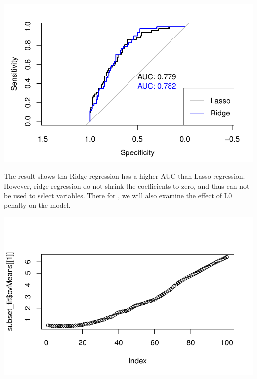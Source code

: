 \documentclass[
  letterpaper,
  DIV=11,
  numbers=noendperiod]{scrartcl}
\newenvironment{Shaded}{\begin{snugshade}}{\end{snugshade}}
\newcommand{\AttributeTok}[1]{\textcolor[rgb]{0.40,0.45,0.13}{#1}}
\newcommand{\DecValTok}[1]{\textcolor[rgb]{0.68,0.00,0.00}{#1}}
\newcommand{\FunctionTok}[1]{\textcolor[rgb]{0.28,0.35,0.67}{#1}}
\newcommand{\NormalTok}[1]{\textcolor[rgb]{0.00,0.23,0.31}{#1}}
\newcommand{\OtherTok}[1]{\textcolor[rgb]{0.00,0.23,0.31}{#1}}
\newcommand{\SpecialCharTok}[1]{\textcolor[rgb]{0.37,0.37,0.37}{#1}}
\newcommand{\StringTok}[1]{\textcolor[rgb]{0.13,0.47,0.30}{#1}}
\begin{document}
\includegraphics{Untitled_files/figure-pdf/unnamed-chunk-6-1.pdf}

The result shows tha Ridge regression has a higher AUC than Lasso
regression. However, ridge regression do not shrink the coefficients to
zero, and thus can not be used to select variables. There for , we will
also examine the effect of L0 penalty on the model.

\begin{Shaded}
\end{Shaded}

\includegraphics{Untitled_files/figure-pdf/unnamed-chunk-7-1.pdf}
\end{document}
